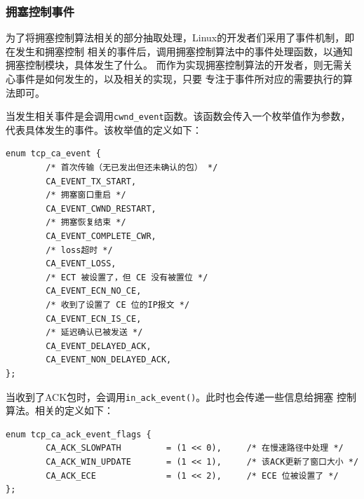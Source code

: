 \subsubsection{拥塞控制事件}
为了将拥塞控制算法相关的部分抽取处理，Linux的开发者们采用了事件机制，即在发生和拥塞控制
相关的事件后，调用拥塞控制算法中的事件处理函数，以通知拥塞控制模块，具体发生了什么。
而作为实现拥塞控制算法的开发者，则无需关心事件是如何发生的，以及相关的实现，只要
专注于事件所对应的需要执行的算法即可。

当发生相关事件是会调用\texttt{cwnd_event}函数。该函数会传入一个枚举值作为参数，
代表具体发生的事件。该枚举值的定义如下：
\begin{verbatim}
enum tcp_ca_event {
        /* 首次传输（无已发出但还未确认的包） */
        CA_EVENT_TX_START,
        /* 拥塞窗口重启 */
        CA_EVENT_CWND_RESTART,  
        /* 拥塞恢复结束 */
        CA_EVENT_COMPLETE_CWR,
        /* loss超时 */
        CA_EVENT_LOSS,          
        /* ECT 被设置了，但 CE 没有被置位 */
        CA_EVENT_ECN_NO_CE,     
        /* 收到了设置了 CE 位的IP报文 */
        CA_EVENT_ECN_IS_CE,     
        /* 延迟确认已被发送 */
        CA_EVENT_DELAYED_ACK,
        CA_EVENT_NON_DELAYED_ACK,
};
\end{verbatim}

当收到了ACK包时，会调用\texttt{in_ack_event()}。此时也会传递一些信息给拥塞
控制算法。相关的定义如下：
\begin{verbatim}
enum tcp_ca_ack_event_flags {
        CA_ACK_SLOWPATH         = (1 << 0),     /* 在慢速路径中处理 */
        CA_ACK_WIN_UPDATE       = (1 << 1),     /* 该ACK更新了窗口大小 */
        CA_ACK_ECE              = (1 << 2),     /* ECE 位被设置了 */
};
\end{verbatim}



